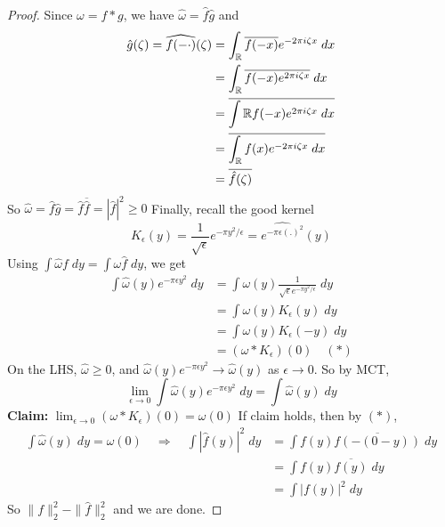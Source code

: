 \begin{proof}
    Since $ \omega = f *g$, we have $\hat{\omega} = \hat{f}\hat{g}$ and 
    \begin{align*}
        \hat{g}(\zeta) = \widehat{f(- \cdot)}(\zeta) &= \int_{\mathbb{R}} \overline{f(-x)}e^{-2 \pi i \zeta x} \; dx \\
        &= \int_{\mathbb{R}} \overline{f(-x)e^{2 \pi i \zeta x}} \; dx \\
        &= \overline{\int{\mathbb{R}} f(-x) e^{2 \pi i \zeta x} \; dx} \\
        &= \overline{\int_{\mathbb{R}} f(x) e^{-2 \pi i \zeta x} \; dx} \\
        &= \overline{\hat{f}(\zeta)}
    \end{align*}
    So $\hat{\omega} = \hat{f} \hat{g} = \hat{f} \overline{\hat{f}} = |\hat{f}|^2 \geq 0$
    Finally, recall the good kernel
    \[
        K_\epsilon(y) = \frac{1}{\sqrt{\epsilon}} e^{-\pi y^2 / \epsilon} = \widehat{e^{-\pi \epsilon (.)^2}}(y)
    \]  
    Using $\int \hat{\omega} f \; dy = \int \omega \hat{f} \; dy$, we get
    \begin{align*}
        \int \hat{\omega}(y) e^{-\pi \epsilon y^2} \; dy &= \int \omega(y) \frac{1}{\sqrt{\epsilon}e^{-\pi y^2 / \epsilon}} \; dy \\
        &= \int \omega(y) K_\epsilon(y) \; dy \\
        &= \int \omega(y) K_\epsilon(-y) \; dy \\
        &= (\omega * K_\epsilon)(0) \quad (*)
    \end{align*} 
    On the LHS, $\hat{\omega} \geq 0$, and $\hat{\omega}(y)e^{-\pi \epsilon y^2} \to \hat{\omega}(y) $ as $\epsilon \to 0$.
    So by MCT, 
    \[
        \lim_{\epsilon \to 0} \int \hat{\omega}(y) e^{- \pi \epsilon y^2} \; dy = \int \hat{\omega}(y) \; dy
    \] 
    \textbf{Claim:} $\lim_{\epsilon \to 0} (\omega * K_\epsilon)(0) = \omega(0)$
    \newline \noindent If claim holds, then by $(*)$, 
    \begin{align*}
        \int \hat{\omega}(y) \; dy = \omega(0) \quad \Rightarrow \quad \int |\hat{f}(y)|^2 \; dy &= \int f(y) \overline{f(-(0 - y))} \; dy \\
        &= \int f(y) \overline{f(y)} \; dy \\
        &= \int |f(y)|^2 \; dy
    \end{align*}  
    So $\| f \|_2^2 - \| \hat{f} \|_2^2  $ and we are done.
    

\end{proof}
